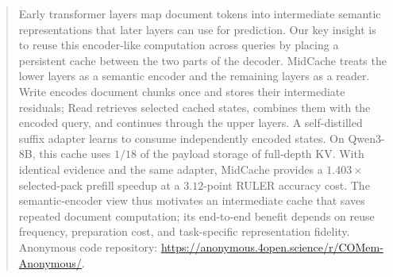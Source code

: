 \begin{abstract}
Early transformer layers map document tokens into intermediate semantic representations that later layers can use for prediction. Our key insight is to reuse this encoder-like computation across queries by placing a persistent cache between the two parts of the decoder. MidCache treats the lower layers as a semantic encoder and the remaining layers as a reader. Write encodes document chunks once and stores their intermediate residuals; Read retrieves selected cached states, combines them with the encoded query, and continues through the upper layers. A self-distilled suffix adapter learns to consume independently encoded states. On Qwen3-8B, this cache uses $1/18$ of the payload storage of full-depth KV. With identical evidence and the same adapter, MidCache provides a $1.403\times$ selected-pack prefill speedup at a $3.12$-point RULER accuracy cost. The semantic-encoder view thus motivates an intermediate cache that saves repeated document computation; its end-to-end benefit depends on reuse frequency, preparation cost, and task-specific representation fidelity.
Anonymous code repository: \url{https://anonymous.4open.science/r/COMem-Anonymous/}.
\end{abstract}
